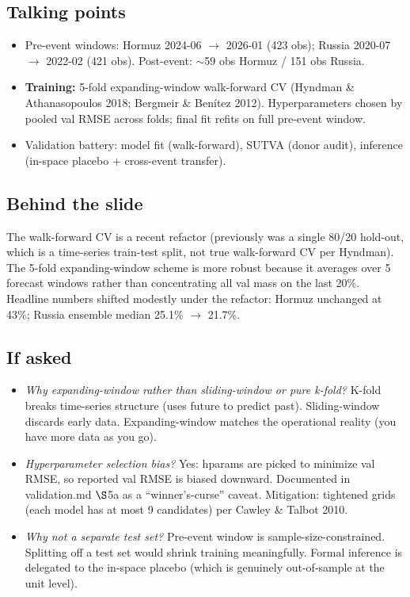 \documentclass[11pt,a4paper]{article}
\newcommand{\highlight}[1]{\textcolor{accent}{\textbf{#1}}}
\begin{document}
\subsection{Talking points}
\begin{itemize}
  \item Pre-event windows: Hormuz 2024-06 $\to$ 2026-01 (423 obs); Russia 2020-07 $\to$ 2022-02 (421 obs). Post-event: $\sim$59 obs Hormuz / 151 obs Russia.
  \item \highlight{Training:} 5-fold expanding-window walk-forward CV (Hyndman \& Athanasopoulos 2018; Bergmeir \& Benítez 2012). Hyperparameters chosen by pooled val RMSE across folds; final fit refits on full pre-event window.
  \item Validation battery: model fit (walk-forward), SUTVA (donor audit), inference (in-space placebo + cross-event transfer).
\end{itemize}

\subsection{Behind the slide}
The walk-forward CV is a recent refactor (previously was a single 80/20 hold-out, which is a time-series train-test split, not true walk-forward CV per Hyndman). The 5-fold expanding-window scheme is more robust because it averages over 5 forecast windows rather than concentrating all val mass on the last 20\%. Headline numbers shifted modestly under the refactor: Hormuz unchanged at 43\%; Russia ensemble median 25.1\% $\to$ 21.7\%.

\subsection{If asked}
\begin{itemize}
  \item \textit{Why expanding-window rather than sliding-window or pure k-fold?} K-fold breaks time-series structure (uses future to predict past). Sliding-window discards early data. Expanding-window matches the operational reality (you have more data as you go).
  \item \textit{Hyperparameter selection bias?} Yes: hparams are picked to minimize val RMSE, so reported val RMSE is biased downward. Documented in validation.md $\S$5a as a ``winner's-curse'' caveat. Mitigation: tightened grids (each model has at most 9 candidates) per Cawley \& Talbot 2010.
  \item \textit{Why not a separate test set?} Pre-event window is sample-size-constrained. Splitting off a test set would shrink training meaningfully. Formal inference is delegated to the in-space placebo (which is genuinely out-of-sample at the unit level).
\end{itemize}
\end{document}
